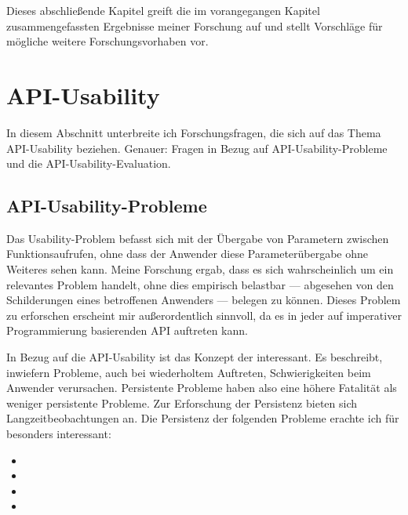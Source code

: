 Dieses abschließende Kapitel greift die im vorangegangen Kapitel zusammengefassten Ergebnisse meiner Forschung auf und stellt Vorschläge für mögliche weitere Forschungsvorhaben vor.

\section{API-Usability}

In diesem Abschnitt unterbreite ich Forschungsfragen, die sich auf das Thema API-Usability beziehen. Genauer: Fragen in Bezug auf API-Usability-Probleme und die API-Usability-Evaluation. 

\subsection{API-Usability-Probleme}

Das Usability-Problem  befasst sich mit der Übergabe von Parametern zwischen Funktionsaufrufen, ohne dass der Anwender diese Parameterübergabe ohne Weiteres sehen kann. Meine Forschung ergab, dass es sich wahrscheinlich um ein relevantes Problem handelt, ohne dies empirisch belastbar  --- abgesehen von den Schilderungen eines betroffenen Anwenders --- belegen zu können. Dieses Problem zu erforschen erscheint mir außerordentlich sinnvoll, da es in jeder auf imperativer Programmierung basierenden API auftreten kann.

In Bezug auf die API-Usability ist das Konzept der  interessant. Es beschreibt, inwiefern Probleme, auch bei wiederholtem Auftreten, Schwierigkeiten beim Anwender verursachen. Persistente Probleme haben also eine höhere Fatalität als weniger persistente Probleme. Zur Erforschung der Persistenz bieten sich Langzeitbeobachtungen an. Die Persistenz der folgenden Probleme erachte ich für besonders interessant:
\begin{itemize}\itemsep1pt\parskip0pt
  \item[\codebullet{apiua://code/-9223372036854774846}] 
  \item[\codebullet{apiua://code/-9223372036854775057}] 
  \item[\codebullet{apiua://code/-9223372036854775448}] 
  \item[\codebullet{apiua://code/-9223372036854775352}] 
\end{itemize}


